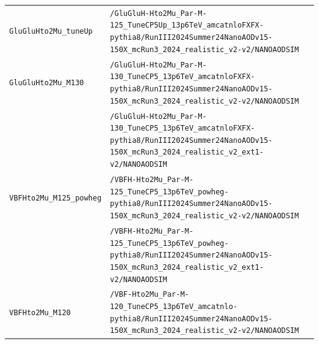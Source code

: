 \begin{longtable}{@{}>{\RaggedRight\arraybackslash}p{} >{\RaggedRight\arraybackslash}p{}@{}}
\addlinespace[2pt]
\texttt{GluGluHto2Mu\_\allowbreak{}tuneUp} & \texttt{/\allowbreak{}GluGluH-\allowbreak{}Hto2Mu\_\allowbreak{}Par-\allowbreak{}M-\allowbreak{}125\_\allowbreak{}TuneCP5Up\_\allowbreak{}13p6TeV\_\allowbreak{}amcatnloFXFX-\allowbreak{}pythia8/\allowbreak{}RunIII2024Summer24NanoAODv15-\allowbreak{}150X\_\allowbreak{}mcRun3\_\allowbreak{}2024\_\allowbreak{}realistic\_\allowbreak{}v2-\allowbreak{}v2/\allowbreak{}NANOAODSIM} \\
\addlinespace[2pt]
\texttt{GluGluHto2Mu\_\allowbreak{}M130} & \texttt{/\allowbreak{}GluGluH-\allowbreak{}Hto2Mu\_\allowbreak{}Par-\allowbreak{}M-\allowbreak{}130\_\allowbreak{}TuneCP5\_\allowbreak{}13p6TeV\_\allowbreak{}amcatnloFXFX-\allowbreak{}pythia8/\allowbreak{}RunIII2024Summer24NanoAODv15-\allowbreak{}150X\_\allowbreak{}mcRun3\_\allowbreak{}2024\_\allowbreak{}realistic\_\allowbreak{}v2-\allowbreak{}v2/\allowbreak{}NANOAODSIM} \\
 & \texttt{/\allowbreak{}GluGluH-\allowbreak{}Hto2Mu\_\allowbreak{}Par-\allowbreak{}M-\allowbreak{}130\_\allowbreak{}TuneCP5\_\allowbreak{}13p6TeV\_\allowbreak{}amcatnloFXFX-\allowbreak{}pythia8/\allowbreak{}RunIII2024Summer24NanoAODv15-\allowbreak{}150X\_\allowbreak{}mcRun3\_\allowbreak{}2024\_\allowbreak{}realistic\_\allowbreak{}v2\_\allowbreak{}ext1-\allowbreak{}v2/\allowbreak{}NANOAODSIM} \\
\addlinespace[2pt]
\texttt{VBFHto2Mu\_\allowbreak{}M125\_\allowbreak{}powheg} & \texttt{/\allowbreak{}VBFH-\allowbreak{}Hto2Mu\_\allowbreak{}Par-\allowbreak{}M-\allowbreak{}125\_\allowbreak{}TuneCP5\_\allowbreak{}13p6TeV\_\allowbreak{}powheg-\allowbreak{}pythia8/\allowbreak{}RunIII2024Summer24NanoAODv15-\allowbreak{}150X\_\allowbreak{}mcRun3\_\allowbreak{}2024\_\allowbreak{}realistic\_\allowbreak{}v2-\allowbreak{}v2/\allowbreak{}NANOAODSIM} \\
 & \texttt{/\allowbreak{}VBFH-\allowbreak{}Hto2Mu\_\allowbreak{}Par-\allowbreak{}M-\allowbreak{}125\_\allowbreak{}TuneCP5\_\allowbreak{}13p6TeV\_\allowbreak{}powheg-\allowbreak{}pythia8/\allowbreak{}RunIII2024Summer24NanoAODv15-\allowbreak{}150X\_\allowbreak{}mcRun3\_\allowbreak{}2024\_\allowbreak{}realistic\_\allowbreak{}v2\_\allowbreak{}ext1-\allowbreak{}v2/\allowbreak{}NANOAODSIM} \\
\addlinespace[2pt]
\texttt{VBFHto2Mu\_\allowbreak{}M120} & \texttt{/\allowbreak{}VBF-\allowbreak{}Hto2Mu\_\allowbreak{}Par-\allowbreak{}M-\allowbreak{}120\_\allowbreak{}TuneCP5\_\allowbreak{}13p6TeV\_\allowbreak{}amcatnlo-\allowbreak{}pythia8/\allowbreak{}RunIII2024Summer24NanoAODv15-\allowbreak{}150X\_\allowbreak{}mcRun3\_\allowbreak{}2024\_\allowbreak{}realistic\_\allowbreak{}v2-\allowbreak{}v2/\allowbreak{}NANOAODSIM} \\

\end{longtable}
